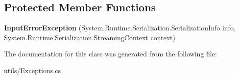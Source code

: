 \subsection*{Protected Member Functions}
\begin{DoxyCompactItemize}
\item 
\mbox{\label{class_minecraftchest1_1_1_utils_1_1_input_error_exception_aa0a4f5a18c8d9973bbb9fa003278e2a1}} 
{\bfseries Input\+Error\+Exception} (System.\+Runtime.\+Serialization.\+Serialization\+Info info, System.\+Runtime.\+Serialization.\+Streaming\+Context context)
\end{DoxyCompactItemize}


The documentation for this class was generated from the following file\+:\begin{DoxyCompactItemize}
\item 
utils/Exceptions.\+cs\end{DoxyCompactItemize}
